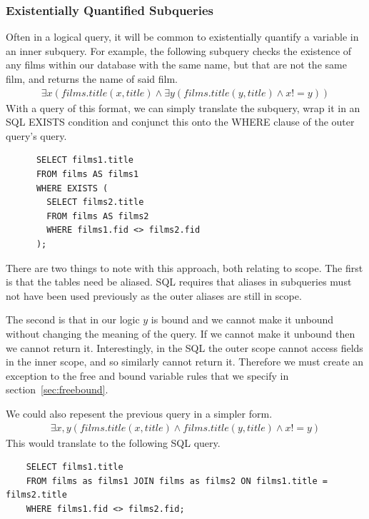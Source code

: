 \documentclass[a4paper, 11pt]{article}
\begin{document}
    \subsubsection{Existentially Quantified Subqueries}
    \label{sec:existential}
    Often in a logical query, it will be common to existentially quantify a
    variable in an inner subquery. For example, the following subquery checks
    the existence of any films within our database with the same name, but that
    are not the same film, and returns the name of said film.
    \begin{gather}
      \exists x(films.title(x, title) \land \exists y(films.title(y,
      title) \land x != y))
    \end{gather}
    With a query of this format, we can simply translate the subquery, wrap it
    in an SQL EXISTS condition and conjunct this onto the WHERE clause of the
    outer query's query.

    \begin{verbatim}
      SELECT films1.title
      FROM films AS films1
      WHERE EXISTS (
        SELECT films2.title
        FROM films AS films2
        WHERE films1.fid <> films2.fid
      );
    \end{verbatim}

    There are two things to note with this approach, both relating to scope.
    The first is that the tables need be aliased. SQL requires that aliases
    in subqueries must not have been used previously as the outer aliases are
    still in scope.
    
    The second is that in our logic $y$ is bound and we cannot make it unbound
    without changing the meaning of the query. If we cannot make it unbound
    then we cannot return it. Interestingly, in the SQL the outer scope cannot
    access fields in the inner scope, and so similarly cannot return it.
    Therefore we must create an exception to the free and bound variable rules
    that we specify in section~\ref{sec:freebound}.

    We could also repesent the previous query in a simpler form.
    \begin{gather}
      \exists x,y(films.title(x, title) \land films.title(y, title)
        \land x != y)
    \end{gather}
    This would translate to the following SQL query.

    \begin{verbatim}
    SELECT films1.title
    FROM films as films1 JOIN films as films2 ON films1.title = films2.title
    WHERE films1.fid <> films2.fid;
    \end{verbatim}
\end{document}
